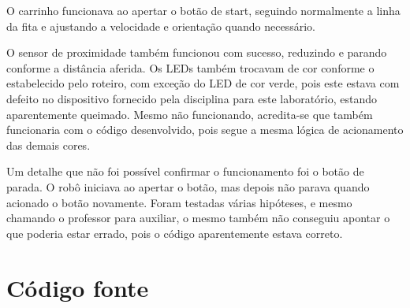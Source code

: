 \documentclass{article}
\begin{document}
O carrinho funcionava ao apertar o botão de start, seguindo normalmente a linha da fita e ajustando a velocidade e orientação quando necessário. 

O sensor de proximidade também funcionou com sucesso, reduzindo e parando conforme a distância aferida. Os LEDs também trocavam de cor conforme o estabelecido pelo roteiro, com exceção do LED de cor verde, pois este estava com defeito no dispositivo fornecido pela disciplina para este laboratório, estando aparentemente queimado. Mesmo não funcionando, acredita-se que também funcionaria com o código desenvolvido, pois segue a mesma lógica de acionamento das demais cores.

Um detalhe que não foi possível confirmar o funcionamento foi o botão de parada. O robô iniciava ao apertar o botão, mas depois não parava quando acionado o botão novamente. Foram testadas várias hipóteses, e mesmo chamando o professor para auxiliar, o mesmo também não conseguiu apontar o que poderia estar errado, pois o código aparentemente estava correto.

\newpage
\section{Código fonte}

\inputminted{c}{code/code.c}
\end{document}

